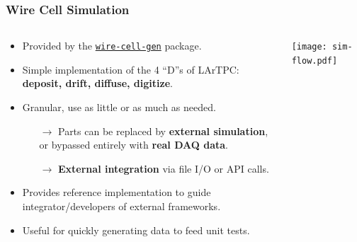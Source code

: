 \documentclass[xcolor=dvipsnames]{beamer}
\begin{document}
\begin{frame}

  \frametitle{Wire Cell Simulation}

  \begin{columns}
    \begin{column}{0.75\textwidth}
      \begin{itemize}\footnotesize
      \item Provided by the \href{https://github.com/WireCell/wire-cell-gen}{\texttt{wire-cell-gen}} package.
      \item Simple implementation of the 4 ``D''s of LArTPC:\\
        \textbf{deposit, drift, diffuse, digitize}.
      \item Granular, use as little or as much as needed.
        \begin{itemize}\scriptsize
        \item[$\rightarrow$] Parts can be replaced by \textbf{external
          simulation}, \\or bypassed entirely with \textbf{real DAQ data}.
        \item[$\rightarrow$] \textbf{External integration} via file I/O or API calls.
        \end{itemize}
      \item Provides reference implementation to guide integrator/developers of external frameworks.
      \item Useful for quickly generating data to feed unit tests.
      \end{itemize}
    \end{column}
    \begin{column}{0.25\textwidth}
      \vspace{-10mm}
      \texttt{[image: sim-flow.pdf]}
    \end{column}
  \end{columns}
\end{frame}
\end{document}
